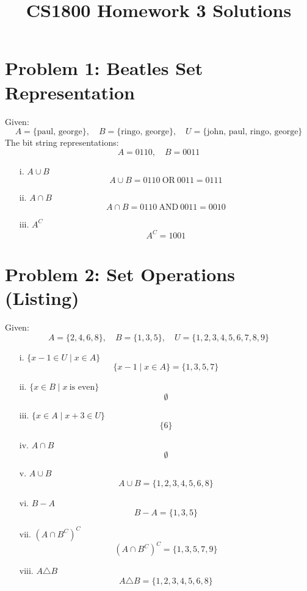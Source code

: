 \documentclass{article}
\title{CS1800 Homework 3 Solutions}
\author{}
\date{}
\begin{document}
\maketitle
\newpage

\section*{Problem 1: Beatles Set Representation}

Given:
\[
A = \{ \text{paul, george} \}, \quad B = \{ \text{ringo, george} \}, \quad U = \{ \text{john, paul, ringo, george} \}
\]
The bit string representations:
\[
A = 0110, \quad B = 0011
\]
\begin{enumerate}
    \item[i.] \( A \cup B \)
    \[
    A \cup B = 0110 \ \text{OR} \ 0011 = 0111
    \]
    \item[ii.] \( A \cap B \)
    \[
    A \cap B = 0110 \ \text{AND} \ 0011 = 0010
    \]
    \item[iii.] \( A^C \)
    \[
    A^C = 1001
    \]
\end{enumerate}

\newpage
\section*{Problem 2: Set Operations (Listing)}

Given:
\[
A = \{ 2, 4, 6, 8 \}, \quad B = \{ 1, 3, 5 \}, \quad U = \{ 1, 2, 3, 4, 5, 6, 7, 8, 9 \}
\]
\begin{enumerate}
    \item[i.] \( \{ x - 1 \in U \mid x \in A \} \)
    \[
    \{ x - 1 \mid x \in A \} = \{ 1, 3, 5, 7 \}
    \]
    \item[ii.] \( \{ x \in B \mid x \ \text{is even} \} \)
    \[
    \emptyset
    \]
    \item[iii.] \( \{ x \in A \mid x + 3 \in U \} \)
    \[
    \{ 6 \}
    \]
    \item[iv.] \( A \cap B \)
    \[
    \emptyset
    \]
    \item[v.] \( A \cup B \)
    \[
    A \cup B = \{ 1, 2, 3, 4, 5, 6, 8 \}
    \]
    \item[vi.] \( B - A \)
    \[
    B - A = \{ 1, 3, 5 \}
    \]
    \item[vii.] \( (A \cap B^C)^C \)
    \[
    (A \cap B^C)^C = \{ 1, 3, 5, 7, 9 \}
    \]
    \item[viii.] \( A \triangle B \)
    \[
    A \triangle B = \{ 1, 2, 3, 4, 5, 6, 8 \}
    \]
\end{enumerate}
\end{document}
